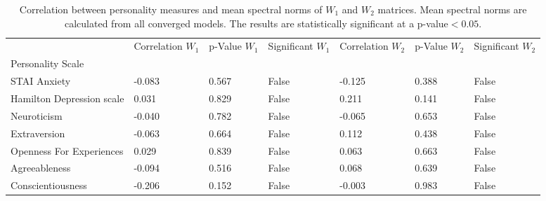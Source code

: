 \begin{table}
\centering
\caption{Correlation between personality measures and mean spectral norms of $W_1$ and $W_2$ matrices.                                                                                   Mean spectral norms are calculated from all converged models.                                                                                   The results are statistically significant at a p-value$<0.05.$}
\label{tab:mean_spec_norms_personality_cor_table}
\begin{tabular}{lllllll}
\toprule
 & Correlation $W_1$ & p-Value $W_1$ & Significant $W_1$ & Correlation $W_2$ & p-Value $W_2$ & Significant $W_2$ \\
Personality Scale &  &  &  &  &  &  \\
\midrule
STAI Anxiety & -0.083 & 0.567 & False & -0.125 & 0.388 & False \\
Hamilton Depression scale & 0.031 & 0.829 & False & 0.211 & 0.141 & False \\
Neuroticism & -0.040 & 0.782 & False & -0.065 & 0.653 & False \\
Extraversion & -0.063 & 0.664 & False & 0.112 & 0.438 & False \\
Openness For Experiences & 0.029 & 0.839 & False & 0.063 & 0.663 & False \\
Agreeableness & -0.094 & 0.516 & False & 0.068 & 0.639 & False \\
Conscientiousness & -0.206 & 0.152 & False & -0.003 & 0.983 & False \\
\bottomrule
\end{tabular}
\end{table}
